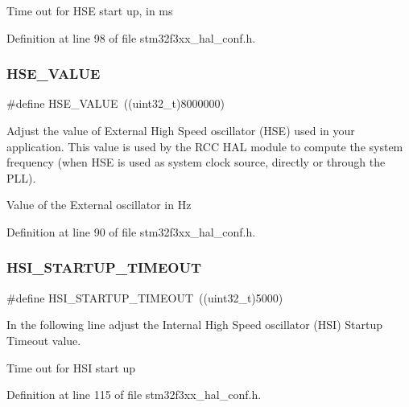 Time out for H\+SE start up, in ms 

Definition at line 98 of file stm32f3xx\+\_\+hal\+\_\+conf.\+h.

\mbox{\label{stm32f3xx__hal__conf_8h_aeafcff4f57440c60e64812dddd13e7cb}} 
\subsubsection{H\+S\+E\+\_\+\+V\+A\+L\+UE}
{\footnotesize\ttfamily \#define H\+S\+E\+\_\+\+V\+A\+L\+UE~((uint32\+\_\+t)8000000)}



Adjust the value of External High Speed oscillator (H\+SE) used in your application. This value is used by the R\+CC H\+AL module to compute the system frequency (when H\+SE is used as system clock source, directly or through the P\+LL). ~\newline
~\newline
 

Value of the External oscillator in Hz 

Definition at line 90 of file stm32f3xx\+\_\+hal\+\_\+conf.\+h.

\mbox{\label{stm32f3xx__hal__conf_8h_a83f109da654b670743786c6a45284b96}} 
\subsubsection{H\+S\+I\+\_\+\+S\+T\+A\+R\+T\+U\+P\+\_\+\+T\+I\+M\+E\+O\+UT}
{\footnotesize\ttfamily \#define H\+S\+I\+\_\+\+S\+T\+A\+R\+T\+U\+P\+\_\+\+T\+I\+M\+E\+O\+UT~((uint32\+\_\+t)5000)}



In the following line adjust the Internal High Speed oscillator (H\+SI) Startup Timeout value. 

Time out for H\+SI start up 

Definition at line 115 of file stm32f3xx\+\_\+hal\+\_\+conf.\+h.

